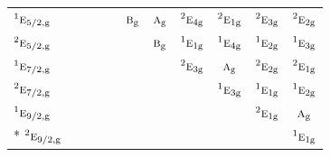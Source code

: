 \documentclass[10pt,a4paper]{article}
\numberwithin{equation}{section}
\newcommand{\irr}[1]{\text{\normalfont\scshape #1}}
\newcommand{\conjpair}[1]{{}^{#1}}
\newcommand{\ptag}[1]{\mathrm{#1}}
\begin{document}
{\begin{longtable}{@{}lcccccccccc@{}}
$\conjpair{1}\irr{e}_{5/2,\ptag{g}}$ &  &  &  &  & $\irr{b}_{\ptag{g}}$ & $\irr{a}_{\ptag{g}}$ & $\conjpair{2}\irr{e}_{4\ptag{g}}$ & $\conjpair{2}\irr{e}_{1\ptag{g}}$ & $\conjpair{2}\irr{e}_{3\ptag{g}}$ & $\conjpair{2}\irr{e}_{2\ptag{g}}$\\
$\conjpair{2}\irr{e}_{5/2,\ptag{g}}$ &  &  &  &  &  & $\irr{b}_{\ptag{g}}$ & $\conjpair{1}\irr{e}_{1\ptag{g}}$ & $\conjpair{1}\irr{e}_{4\ptag{g}}$ & $\conjpair{1}\irr{e}_{2\ptag{g}}$ & $\conjpair{1}\irr{e}_{3\ptag{g}}$\\
$\conjpair{1}\irr{e}_{7/2,\ptag{g}}$ &  &  &  &  &  &  & $\conjpair{2}\irr{e}_{3\ptag{g}}$ & $\irr{a}_{\ptag{g}}$ & $\conjpair{2}\irr{e}_{2\ptag{g}}$ & $\conjpair{2}\irr{e}_{1\ptag{g}}$\\
$\conjpair{2}\irr{e}_{7/2,\ptag{g}}$ &  &  &  &  &  &  &  & $\conjpair{1}\irr{e}_{3\ptag{g}}$ & $\conjpair{1}\irr{e}_{1\ptag{g}}$ & $\conjpair{1}\irr{e}_{2\ptag{g}}$\\
$\conjpair{1}\irr{e}_{9/2,\ptag{g}}$ &  &  &  &  &  &  &  &  & $\conjpair{2}\irr{e}_{1\ptag{g}}$ & $\irr{a}_{\ptag{g}}$\\*
$\conjpair{2}\irr{e}_{9/2,\ptag{g}}$ &  &  &  &  &  &  &  &  &  & $\conjpair{1}\irr{e}_{1\ptag{g}}$\\
\bottomrule\end{longtable}}
\end{document}
